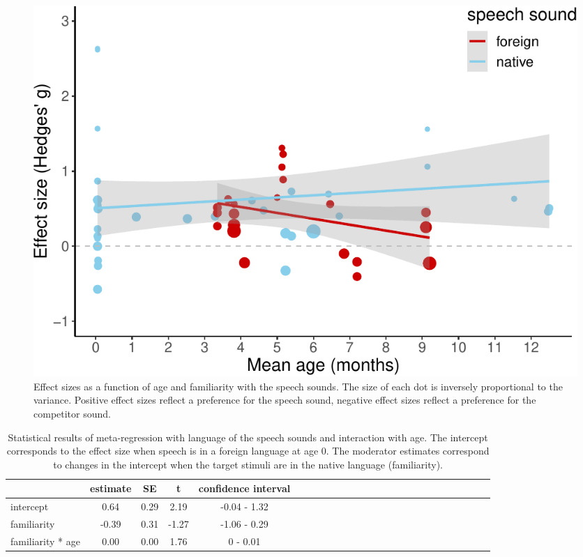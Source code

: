 \documentclass[man]{apa6}
\begin{document}
\begin{figure}
\centering
\includegraphics{MA_speech_pref_files/figure-latex/lang-1.pdf}
\caption{\label{fig:lang}Effect sizes as a function of age and familiarity with the speech sounds. The size of each dot is inversely proportional to the variance. Positive effect sizes reflect a preference for the speech sound, negative effect sizes reflect a preference for the competitor sound.}
\end{figure}

\begin{table}[tbp]
\begin{center}
\begin{threeparttable}
\caption{\label{tab:TableLang}Statistical results of meta-regression with language of the speech sounds and interaction with age. The intercept corresponds to the effect size when speech is in a foreign language at age 0. The moderator estimates correspond to changes in the intercept when the target stimuli are in the native language (familiarity).}
\begin{tabular}{lcccclcccclcccclcccclcccc}
\toprule
 & estimate & SE & t & confidence interval\\
\midrule
intercept & 0.64 & 0.29 & 2.19 & -0.04 - 1.32\\
familiarity & -0.39 & 0.31 & -1.27 & -1.06 - 0.29\\
familiarity * age & 0.00 & 0.00 & 1.76 & 0 - 0.01\\
\bottomrule
\end{tabular}
\end{threeparttable}
\end{center}
\end{table}
\end{document}
